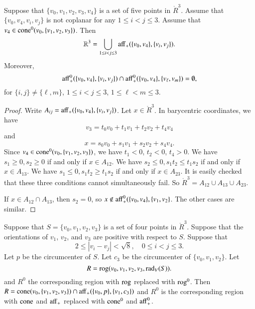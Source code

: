 \newpage

\begin{lemma}
Suppose that $\{v_0,v_1,v_2,v_3,v_4\}$ is a set
of five points in $\ring{R}^3$.  Assume that $\{v_0,v_4,v_i,v_j\}$
is not coplanar for any $1\le i < j \le 3$.
Assume that $v_4\in{\operatorname{cone}}^0(v_0,\{v_1,v_2,v_3\})$.
Then 
   $$
   \mathbb{R}^3 = \bigcup_{1\le i<j\le 3}
    {\operatorname{aff}}_+(\{v_0,v_4\},\{v_i,v_j\}).
   $$
Moreover,
   $$
   {\operatorname{aff}}_+^0(\{v_0,v_4\},\{v_i,v_j\}) \cap
   {\operatorname{aff}}_+^0(\{v_0,v_4\},\{v_\ell,v_m\}) =\emptyset,
   $$
for $\{i,j\}\ne \{\ell,m\}$, $1\le i<j\le 3$, $1\le \ell<m\le 3$.
\end{lemma}

\begin{proof} Write $A_{ij} = {\operatorname{aff}}_+(\{v_0,v_4\},\{v_i,v_j\})$.
  Let $x\in\ring{R}^3$.  In barycentric coordinates, we have
  $$
  v_3 = t_0 v_0 + t_1 v_1 + t_2 v_2 + t_4 v_4
  $$
and
$$
  x = s_0 v_0 + s_1 v_1 + s_2 v_2 + s_4 v_4.
$$
Since $v_4\in{\operatorname{cone}}^0(v_0,\{v_1,v_2,v_3\})$, we have
$t_1<0$, $t_2<0$, $t_4>0$.  
We have $s_1\ge0,s_2\ge0$ if and only if $x\in A_{12}$.
We have $s_2\le0,s_1t_2\le t_1s_2$ if and only if $x\in A_{13}$.
We have $s_1\le0,s_1t_2\ge t_1s_2$ if and only if $x\in A_{23}$.
It is easily checked that these three conditions cannot simultaneously
fail.  So $\ring{R}^3 = A_{12}\cup A_{13}\cup A_{23}$.

If $x\in A_{12}\cap A_{13}$, then $s_2=0$, so $x\not\in{\operatorname{aff}}_+^0(\{v_0,v_4\},\{v_1,v_2\}$.  The other cases are similar.
\end{proof}

\newpage

\begin{lemma}
Suppose that $S=\{v_0,v_1,v_2,v_3\}$ is a set
of four points in $\ring{R}^3$.  Suppose that 
the orientations of $v_1$, $v_2$, and $v_3$ are positive with respect
to $S$.  Suppose that 
  $$
  2 \le |v_i - v_j | < \sqrt8, \quad 0\le i < j \le 3.
  $$
Let $p$ be the circumcenter of $S$.  Let $c_3$
be the circumcenter of $\{v_0,v_1,v_2\}$.
Let 
   $$
   R = {\operatorname{rog}}(v_0,v_1,v_2,v_3,\operatorname{rad}_V(S)).
   $$
and $R^0$ the corresponding region with ${\operatorname{rog}}$ replaced
with ${\operatorname{rog}}^0$.
Then $R = {\operatorname{cone}}(v_0,\{v_1,v_2,v_3\})\cap
  {\operatorname{aff}}_+(\{v_0,p\},\{v_1,c_3\})$ and $R^0$ is the
corresponding region with ${\operatorname{cone}}$ and ${\operatorname{aff}}_+$ replaced
with  ${\operatorname{cone}}^0$ and ${\operatorname{aff}}^0_+$.
\end{lemma}

